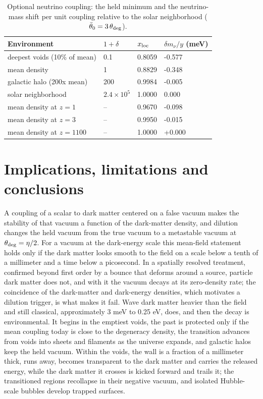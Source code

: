 \documentclass[preprint,12pt]{elsarticle}
\begin{document}
\begin{table}[htbp]\centering\small
\caption{Optional neutrino coupling: the held minimum and the neutrino-mass shift per unit coupling relative to the solar neighborhood ($\bar\theta_0=3\,\theta_{\rm deg}$).}
\begin{tabular}{llll}
\toprule
Environment & $1+\delta$ & $x_{\rm loc}$ & $\delta m_\nu/y$ (meV) \\ \midrule
deepest voids (10\% of mean) & 0.1 & 0.8059 & -0.577 \\
mean density & 1 & 0.8829 & -0.348 \\
galactic halo (200x mean) & 200 & 0.9984 & -0.005 \\
solar neighborhood & $2.4\times10^{5}$ & 1.0000 & 0.000 \\
mean density at $z=1$ & -- & 0.9670 & -0.098 \\
mean density at $z=3$ & -- & 0.9950 & -0.015 \\
mean density at $z=1100$ & -- & 1.0000 & +0.000 \\
\bottomrule
\end{tabular}
\end{table}
\section{Implications, limitations and conclusions}
A coupling of a scalar to dark matter centered on a false vacuum makes the stability of that vacuum a function of the dark-matter density, and dilution changes the held vacuum from the true vacuum to a metastable vacuum at $\theta_{\rm deg}=\eta/2$. For a vacuum at the dark-energy scale this mean-field statement holds only if the dark matter looks smooth to the field on a scale below a tenth of a millimeter and a time below a picosecond. In a spatially resolved treatment, confirmed beyond first order by a bounce that deforms around a source, particle dark matter does not, and with it the vacuum decays at its zero-density rate; the coincidence of the dark-matter and dark-energy densities, which motivates a dilution trigger, is what makes it fail. Wave dark matter heavier than the field and still classical, approximately 3 meV to 0.25 eV, does, and then the decay is environmental. It begins in the emptiest voids, the past is protected only if the mean coupling today is close to the degeneracy density, the transition advances from voids into sheets and filaments as the universe expands, and galactic halos keep the held vacuum. Within the voids, the wall is a fraction of a millimeter thick, runs away, becomes transparent to the dark matter and carries the released energy, while the dark matter it crosses is kicked forward and trails it; the transitioned regions recollapse in their negative vacuum, and isolated Hubble-scale bubbles develop trapped surfaces.
\end{document}
